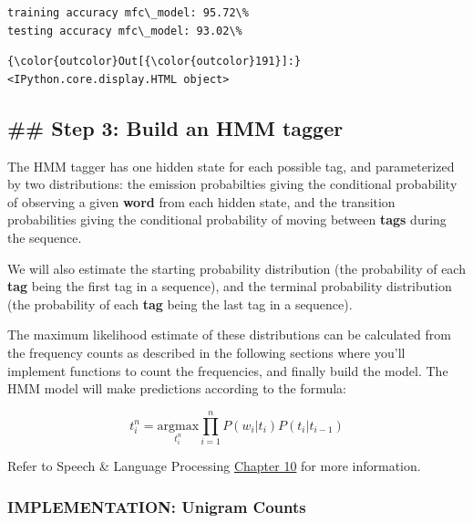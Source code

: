 \documentclass[11pt]{article}
\begin{document}
    \begin{Verbatim}[commandchars=\\\{\}]
training accuracy mfc\_model: 95.72\%
testing accuracy mfc\_model: 93.02\%

    \end{Verbatim}

\begin{Verbatim}[commandchars=\\\{\}]
{\color{outcolor}Out[{\color{outcolor}191}]:} <IPython.core.display.HTML object>
\end{Verbatim}
            
    \hypertarget{step-3-build-an-hmm-tagger}{%
\subsection{\#\# Step 3: Build an HMM
tagger}\label{step-3-build-an-hmm-tagger}}

The HMM tagger has one hidden state for each possible tag, and
parameterized by two distributions: the emission probabilties giving the
conditional probability of observing a given \textbf{word} from each
hidden state, and the transition probabilities giving the conditional
probability of moving between \textbf{tags} during the sequence.

We will also estimate the starting probability distribution (the
probability of each \textbf{tag} being the first tag in a sequence), and
the terminal probability distribution (the probability of each
\textbf{tag} being the last tag in a sequence).

The maximum likelihood estimate of these distributions can be calculated
from the frequency counts as described in the following sections where
you'll implement functions to count the frequencies, and finally build
the model. The HMM model will make predictions according to the formula:

\[t_i^n = \underset{t_i^n}{\mathrm{argmax}} \prod_{i=1}^n P(w_i|t_i) P(t_i|t_{i-1})\]

Refer to Speech \& Language Processing
\href{https://web.stanford.edu/~jurafsky/slp3/10.pdf}{Chapter 10} for
more information.

    \hypertarget{implementation-unigram-counts}{%
\subsubsection{IMPLEMENTATION: Unigram
Counts}\label{implementation-unigram-counts}}
\end{document}
